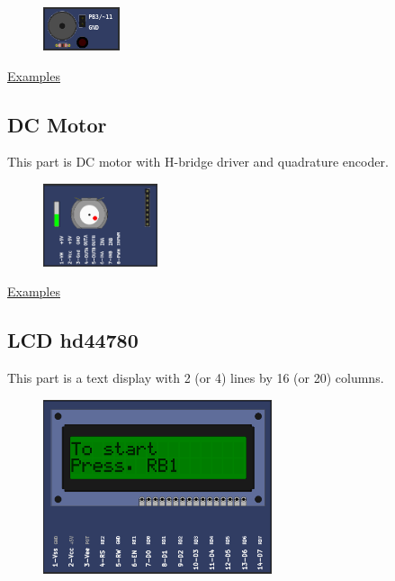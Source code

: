 \begin{figure}[H]
\center
\includegraphics[width=0.2\textwidth]{img/part_buzzer.png} 
\end{figure} 

\href{https://lcgamboa.github.io/picsimlab_examples/Parts.html\#Buzzer}{Examples}


\subsection{DC Motor}

This part is DC motor with H-bridge driver and quadrature encoder. 

\begin{figure}[H]
\center
\includegraphics[width=0.3\textwidth]{img/part_dcmotor.png} 
\end{figure} 

\href{https://lcgamboa.github.io/picsimlab_examples/Parts.html\#DC_Motor}{Examples}


\subsection{LCD hd44780}

This part is a text display with 2 (or 4) lines by 16 (or 20) columns.

\begin{figure}[H]
\center
\includegraphics[width=0.6\textwidth]{img/part_hd44780_2x16.png} 
\end{figure} 

